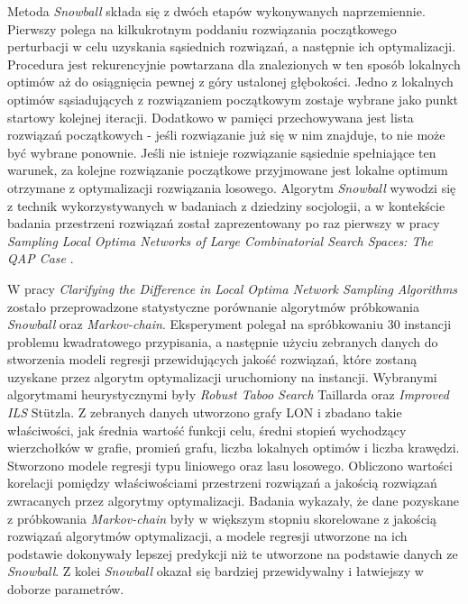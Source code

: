 Metoda \textit{Snowball} składa się z dwóch etapów wykonywanych naprzemiennie. Pierwszy polega na kilkukrotnym poddaniu rozwiązania początkowego perturbacji
w celu uzyskania sąsiednich rozwiązań, a następnie ich optymalizacji. Procedura jest rekurencyjnie powtarzana dla znalezionych w ten sposób lokalnych optimów
aż do osiągnięcia pewnej z góry ustalonej głębokości. Jedno z lokalnych optimów sąsiadujących z rozwiązaniem początkowym zostaje wybrane jako punkt startowy kolejnej iteracji.
Dodatkowo w pamięci przechowywana jest lista rozwiązań początkowych - jeśli rozwiązanie już się w nim znajduje, to nie może być wybrane ponownie.
Jeśli nie istnieje rozwiązanie sąsiednie spełniające ten warunek, za kolejne rozwiązanie początkowe przyjmowane jest lokalne optimum otrzymane z optymalizacji rozwiązania losowego.
Algorytm \textit{Snowball} wywodzi się z technik wykorzystywanych w badaniach z dziedziny socjologii, a w kontekście badania przestrzeni rozwiązań
został zaprezentowany po raz pierwszy w pracy \textit{Sampling Local Optima Networks of Large Combinatorial Search Spaces: The QAP Case}
\cite{DBLP:conf/ppsn/VerelDOT18}.

W pracy \textit{Clarifying the Difference in Local Optima Network Sampling Algorithms} \cite{DBLP:conf/evoW/ThomsonOV19}
zostało przeprowadzone statystyczne porównanie algorytmów próbkowania \textit{Snowball}
oraz \textit{Markov-chain}. Eksperyment polegał na spróbkowaniu 30 instancji problemu kwadratowego przypisania, a następnie użyciu zebranych danych
do stworzenia modeli regresji przewidujących jakość rozwiązań, które zostaną uzyskane przez algorytm optymalizacji uruchomiony na instancji.
Wybranymi algorytmami heurystycznymi były \textit{Robust Taboo Search} Taillarda oraz \textit{Improved ILS} Stützla.
Z zebranych danych utworzono grafy LON i zbadano takie właściwości, jak średnia wartość funkcji celu, średni stopień wychodzący
wierzchołków w grafie, promień grafu, liczba lokalnych optimów i liczba krawędzi.
Stworzono modele regresji typu liniowego oraz lasu losowego. Obliczono wartości korelacji pomiędzy właściwościami przestrzeni rozwiązań
a jakością rozwiązań zwracanych przez algorytmy optymalizacji.
Badania wykazały, że dane pozyskane z próbkowania \textit{Markov-chain} były w większym stopniu skorelowane z jakością rozwiązań algorytmów
optymalizacji, a modele regresji utworzone na ich podstawie dokonywały lepszej predykcji niż te utworzone na podstawie danych ze \textit{Snowball}.
Z kolei \textit{Snowball} okazał się bardziej przewidywalny i łatwiejszy w doborze parametrów.

